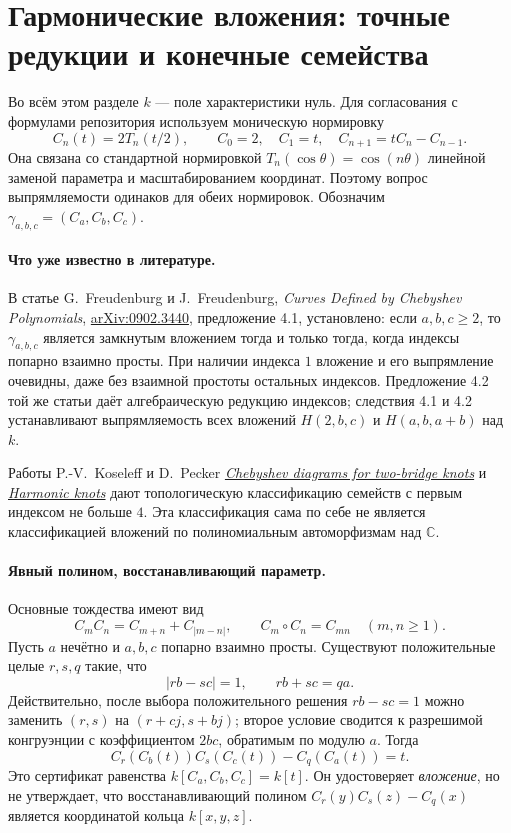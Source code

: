\section{Гармонические вложения: точные редукции и конечные семейства}

Во всём этом разделе $k$ --- поле характеристики нуль. Для согласования
с формулами репозитория используем моническую нормировку
\[
 C_n(t)=2T_n(t/2),\qquad C_0=2,\quad C_1=t,\quad
 C_{n+1}=tC_n-C_{n-1}.
\]
Она связана со стандартной нормировкой $T_n(\cos\theta)=\cos(n\theta)$
линейной заменой параметра и масштабированием координат. Поэтому вопрос
выпрямляемости одинаков для обеих нормировок. Обозначим
$\gamma_{a,b,c}=(C_a,C_b,C_c)$.

\paragraph{Что уже известно в литературе.}
В статье G.~Freudenburg и J.~Freudenburg,
\emph{Curves Defined by Chebyshev Polynomials},
\href{https://arxiv.org/abs/0902.3440}{arXiv:0902.3440},
предложение 4.1, установлено: если $a,b,c\geq2$, то $\gamma_{a,b,c}$
является замкнутым вложением тогда и только тогда, когда индексы попарно
взаимно просты. При наличии индекса $1$ вложение и его выпрямление
очевидны, даже без взаимной простоты остальных индексов.
Предложение 4.2 той же статьи даёт алгебраическую редукцию индексов;
следствия 4.1 и 4.2 устанавливают выпрямляемость всех вложений
$H(2,b,c)$ и $H(a,b,a+b)$ над $k$.

Работы P.-V.~Koseleff и D.~Pecker
\href{https://arxiv.org/abs/0909.3281}{\emph{Chebyshev diagrams for two-bridge knots}}
и \href{https://arxiv.org/abs/1203.4376}{\emph{Harmonic knots}}
дают топологическую классификацию семейств с первым индексом не больше
$4$. Эта классификация сама по себе не является классификацией
вложений по полиномиальным автоморфизмам над $\mathbb C$.

\paragraph{Явный полином, восстанавливающий параметр.}
Основные тождества имеют вид
\[
 C_mC_n=C_{m+n}+C_{|m-n|},\qquad C_m\circ C_n=C_{mn}
 \quad(m,n\geq1).
\]
Пусть $a$ нечётно и $a,b,c$ попарно взаимно просты. Существуют
положительные целые $r,s,q$ такие, что
\[
 |rb-sc|=1,\qquad rb+sc=qa.
\]
Действительно, после выбора положительного решения $rb-sc=1$ можно
заменить $(r,s)$ на $(r+cj,s+bj)$; второе условие сводится к разрешимой
конгруэнции с коэффициентом $2bc$, обратимым по модулю $a$.
Тогда
\[
 \boxed{\;C_r(C_b(t))C_s(C_c(t))-C_q(C_a(t))=t.\;}
\]
Это сертификат равенства $k[C_a,C_b,C_c]=k[t]$. Он удостоверяет
\emph{вложение}, но не утверждает, что восстанавливающий полином
$C_r(y)C_s(z)-C_q(x)$ является координатой кольца $k[x,y,z]$.

